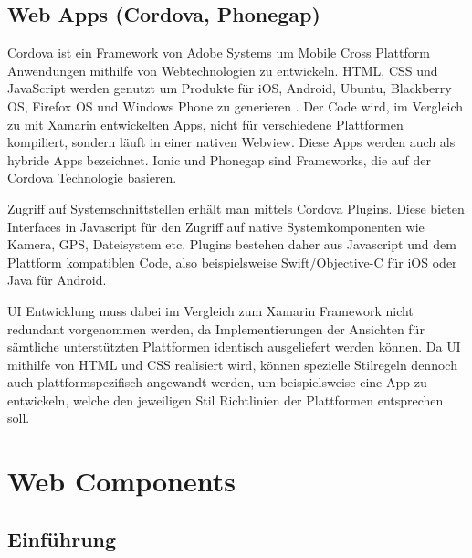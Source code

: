 \newpage


\subsection{Web Apps (Cordova, Phonegap)}

Cordova ist ein Framework von Adobe Systems um Mobile Cross Plattform Anwendungen mithilfe von Webtechnologien zu entwickeln.
\ac{HTML}, \ac{CSS} und JavaScript werden genutzt um Produkte für iOS, Android, Ubuntu, Blackberry OS, Firefox OS und Windows Phone zu generieren \cite{Cordo26:online}.
Der Code wird, im Vergleich zu mit Xamarin entwickelten Apps, nicht für verschiedene Plattformen kompiliert,
sondern läuft in einer nativen Webview. Diese Apps werden auch als hybride Apps bezeichnet.
Ionic und Phonegap sind Frameworks, die auf der Cordova Technologie basieren.

Zugriff auf Systemschnittstellen erhält man mittels Cordova Plugins. Diese bieten
Interfaces in Javascript für den Zugriff auf native Systemkomponenten wie Kamera, GPS, Dateisystem etc.
Plugins bestehen daher aus Javascript und dem Plattform kompatiblen Code,
also beispielsweise Swift/Objective-C für iOS oder Java für Android.

\ac{UI} Entwicklung muss dabei im Vergleich zum Xamarin Framework nicht redundant vorgenommen werden, da Implementierungen der
Ansichten für sämtliche unterstützten Plattformen identisch ausgeliefert werden können.
Da \ac{UI} mithilfe von \ac{HTML} und \ac{CSS} realisiert wird,
können spezielle Stilregeln dennoch auch plattformspezifisch angewandt werden, um beispielsweise eine App zu entwickeln,
welche den jeweiligen Stil Richtlinien der Plattformen entsprechen soll.

\vspace{0.3cm}

\vspace{0.3cm}

\newpage
\section{Web Components}


\subsection{Einführung}

